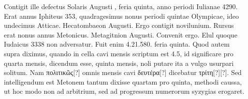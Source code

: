 Contigit ille defectus
Solaris Augusti , feria quinta, anno periodi Iulianae 4290.
Erat
annus Iphiteus 353, quadragesimus nonus periodi quintae Olympicae,
ideo undecimus Atticae.
Hecatombaeon  Augusti.
Ergo  contigit
novilunium.
Rursus erat nonus annus Metonicus.
Metagitnion  Augusti.
Convenit ergo.
Elul quoque Iudaicus 3338 non
adversatur.
Fuit enim 4.21.580. feria quinta.
Quod autem supra
diximus, quando in cella cavi mensis scriptum est 4.5, id significare
pro quarta mensis, dicendum esse, quinta mensis, noli putare ita a vulgo
usurpari solitum.
Nam \textgreek{πολιτικῶς[?]} omnis mensis cavi
 \textgreek{δευτέρα[?]} dicebatur
\textgreek{τρίτη[?][?]}.
Sed intelligendum est Metonem tantum dixisse quartam
pro quinta, methodi caussa, ut hoc modo non ad arbitrium, sed
ad progressum numerorum syzygias erogaret.

